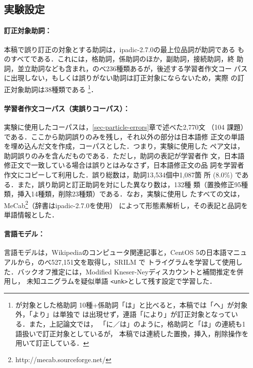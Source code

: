 \documentclass[japanese]{jnlp_1.4}
\begin{document}
\subsection{実験設定}
\label{sec-experimental-settings}

\paragraph{訂正対象助詞：}

本稿で誤り訂正の対象とする助詞は，ipadic-2.7.0の最上位品詞が助詞である
ものすべてである．これには，格助詞，係助詞のほか，副助詞，接続助詞，終
助詞，並立助詞なども含まれ，のべ236種類あるが，後述する学習者作文コー
パスに出現しない，もしくは誤りがない助詞は訂正対象にならないため，実際
の訂正対象助詞は38種類である
\footnote{が対象とした格助詞
10種+係助詞「は」と比べると，本稿では「ヘ」が対象外，「より」は単独で
は出現せず，連語「により」が訂正対象となっている．また，上記論文では，
「に／は」のように，格助詞と「は」の連続も1語扱いで訂正対象としているが，
本稿では連続した置換，挿入，削除操作を用いて訂正している．}．


\paragraph{学習者作文コーパス（実誤りコーパス）：}

実験に使用したコーパスは，\ref{sec-particle-errors}章で述べた2,770文
（104 課題）である．ここから助詞誤りのみを残し，それ以外の部分は日本語修
正文の単語を埋め込んだ文を作成，コーパスとした．つまり，実験に使用した
ペア文は，助詞誤りのみを含んだものである．ただし，助詞の表記が学習者作
文，日本語修正文で一致している場合は誤りとはみなさず，日本語修正文の品
詞を学習者作文にコピーして利用した．誤り総数は，助詞13,534個中1,087箇
所 (8.0\%) である．また，誤り助詞と訂正助詞を対にした異なり数は，132種
類（置換修正95種類，挿入14種類，削除23種類）である．なお，実験に使用し
たすべての文は，MeCab\footnote{http://mecab.sourceforge.net/}（辞書はipadic-2.7.0を使用）
によって形態素解析し，その表記と品詞を単語情報とした．

\paragraph{言語モデル：}

言語モデルは，Wikipediaのコンピュータ関連記事と，CentOS 5の日本語マニュ
アルから，のべ527,151文を取得し，SRILM で
トライグラムを学習して使用した．バックオフ推定には，Modified
Kneser-Neyディスカウントと補間推定を併用し，
未知ユニグラムを疑似単語 \texttt{<unk>}として残す設定で学習した．
\end{document}
